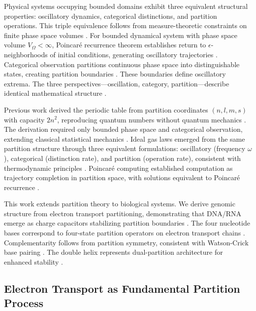 \documentclass[11pt,a4paper]{article}
\theoremstyle{remark}
\begin{document}
Physical systems occupying bounded domains exhibit three equivalent structural properties: oscillatory dynamics, categorical distinctions, and partition operations. This triple equivalence follows from measure-theoretic constraints on finite phase space volumes \citep{poincare1890probleme, birkhoff1931proof, arnold1978mathematical}. For bounded dynamical system with phase space volume $V_{\Omega} < \infty$, Poincaré recurrence theorem establishes return to $\epsilon$-neighborhoods of initial conditions, generating oscillatory trajectories \citep{poincare1890probleme}. Categorical observation partitions continuous phase space into distinguishable states, creating partition boundaries \citep{kolmogorov1957theory}. These boundaries define oscillatory extrema. The three perspectives—oscillation, category, partition—describe identical mathematical structure \citep{Sachikonye2025_IdealGas, Sachikonye2025_Poincare}.

Previous work derived the periodic table from partition coordinates $(n,l,m,s)$ with capacity $2n^2$, reproducing quantum numbers without quantum mechanics \citep{Sachikonye2025_Partition}. The derivation required only bounded phase space and categorical observation, extending classical statistical mechanics \citep{reif1965fundamentals, callen1985thermodynamics}. Ideal gas laws emerged from the same partition structure through three equivalent formulations: oscillatory (frequency $\omega$), categorical (distinction rate), and partition (operation rate), consistent with thermodynamic principles \citep{jarzynski1997nonequilibrium, crooks1999entropy, Sachikonye2025_IdealGas}. Poincaré computing established computation as trajectory completion in partition space, with solutions equivalent to Poincaré recurrence \citep{poincare1890probleme, Sachikonye2025_Poincare}.

This work extends partition theory to biological systems. We derive genomic structure from electron transport partitioning, demonstrating that DNA/RNA emerge as charge capacitors stabilizing partition boundaries \citep{watson1953molecular, bloomfield1997dna, kornyshev2007physics}. The four nucleotide bases correspond to four-state partition operators on electron transport chains \citep{nicholls2013bioenergetics, mitchell1961coupling}. Complementarity follows from partition symmetry, consistent with Watson-Crick base pairing \citep{watson1953molecular}. The double helix represents dual-partition architecture for enhanced stability \citep{travers2015dna}.

\subsection{Electron Transport as Fundamental Partition Process}
\end{document}
